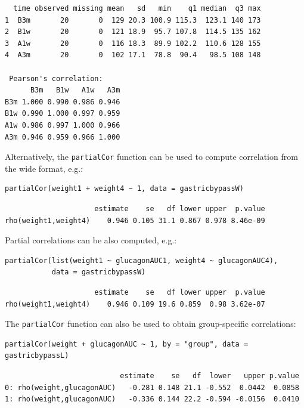 \documentclass[12pt]{article}
\begin{document}
\begin{verbatim}
  time observed missing mean   sd   min    q1 median  q3 max
1  B3m       20       0  129 20.3 100.9 115.3  123.1 140 173
2  B1w       20       0  121 18.9  95.7 107.8  114.5 135 162
3  A1w       20       0  116 18.3  89.9 102.2  110.6 128 155
4  A3m       20       0  102 17.1  78.8  90.4   98.5 108 148

 Pearson's correlation: 
      B3m   B1w   A1w   A3m
B3m 1.000 0.990 0.986 0.946
B1w 0.990 1.000 0.997 0.959
A1w 0.986 0.997 1.000 0.966
A3m 0.946 0.959 0.966 1.000
\end{verbatim}

Alternatively, the \texttt{partialCor} function can be used to compute
correlation from the wide format, e.g.:
\lstset{language=r,label= ,caption= ,captionpos=b,numbers=none}
\begin{lstlisting}
partialCor(weight1 + weight4 ~ 1, data = gastricbypassW)
\end{lstlisting}

\begin{verbatim}
                     estimate    se   df lower upper  p.value
rho(weight1,weight4)    0.946 0.105 31.1 0.867 0.978 8.46e-09
\end{verbatim}


\clearpage

Partial correlations can be also computed, e.g.:
\lstset{language=r,label= ,caption= ,captionpos=b,numbers=none}
\begin{lstlisting}
partialCor(list(weight1 ~ glucagonAUC1, weight4 ~ glucagonAUC4),
           data = gastricbypassW)
\end{lstlisting}

\begin{verbatim}
                     estimate    se   df lower upper  p.value
rho(weight1,weight4)    0.946 0.109 19.6 0.859  0.98 3.62e-07
\end{verbatim}


The \texttt{partialCor} function can also be used to obtain group-specific
correlations:
\lstset{language=r,label= ,caption= ,captionpos=b,numbers=none}
\begin{lstlisting}
partialCor(weight + glucagonAUC ~ 1, by = "group", data = gastricbypassL)
\end{lstlisting}

\begin{verbatim}
                           estimate    se   df  lower   upper p.value
0: rho(weight,glucagonAUC)   -0.281 0.148 21.1 -0.552  0.0442  0.0858
1: rho(weight,glucagonAUC)   -0.336 0.144 22.2 -0.594 -0.0156  0.0410
\end{verbatim}
\end{document}
